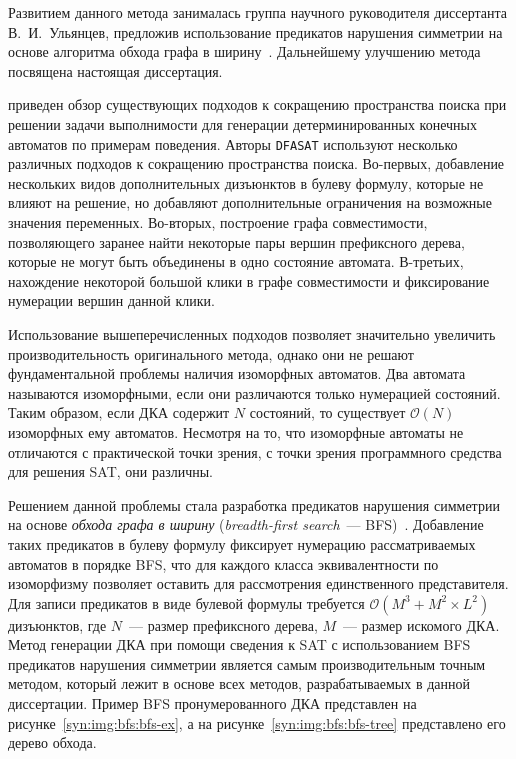 Развитием данного метода занималась группа научного руководителя диссертанта В.~И.~Ульянцев, предложив использование предикатов нарушения симметрии на основе алгоритма обхода графа в ширину~\cite{zakirzyanov2015LATA}.
Дальнейшему улучшению метода посвящена настоящая диссертация.

\insection{\ref{sec:review:sym-breaking}} приведен обзор существующих подходов к сокращению пространства поиска при решении задачи выполнимости для генерации детерминированных конечных автоматов по примерам поведения.
Авторы \texttt{DFASAT} используют несколько различных подходов к сокращению пространства поиска. 
Во-первых, добавление нескольких видов дополнительных дизъюнктов в булеву формулу, которые не влияют на решение, но добавляют дополнительные ограничения на возможные значения переменных.
Во-вторых, построение графа совместимости, позволяющего заранее найти некоторые пары вершин префиксного дерева, которые не могут быть объединены в одно состояние автомата.
В-третьих, нахождение некоторой большой клики в графе совместимости и фиксирование нумерации вершин данной клики.

Использование вышеперечисленных подходов позволяет значительно увеличить производительность оригинального метода, однако они не решают фундаментальной проблемы наличия изоморфных автоматов.
Два автомата называются изоморфными, если они различаются только нумерацией состояний.
Таким образом, если ДКА содержит $N$ состояний, то существует $\mathcal{O}\left(N\right)$ изоморфных ему автоматов.
Несмотря на то, что изоморфные автоматы не отличаются с практической точки зрения, с точки зрения программного средства для решения SAT, они различны.

Решением данной проблемы стала разработка предикатов нарушения симметрии на основе \emph{обхода графа в ширину} (\emph{breadth-first search}~--- BFS)~\cite{zakirzyanov2015LATA}.
Добавление таких предикатов в булеву формулу фиксирует нумерацию рассматриваемых автоматов в порядке BFS, что для каждого класса эквивалентности по изоморфизму позволяет оставить для рассмотрения единственного представителя.
Для записи предикатов в виде булевой формулы требуется $\mathcal{O}\left(M^{3} + M^{2} \times L^{2}\right)$ дизъюнктов, где $N$~--- размер префиксного дерева, $M$~--- размер искомого ДКА.
Метод генерации ДКА при помощи сведения к SAT с использованием BFS предикатов нарушения симметрии является самым производительным точным методом, который лежит в основе всех методов, разрабатываемых в данной диссертации.
Пример BFS пронумерованного ДКА представлен на рисунке~\ref{syn:img:bfs:bfs-ex}, а на рисунке~\ref{syn:img:bfs:bfs-tree} представлено его дерево обхода.

